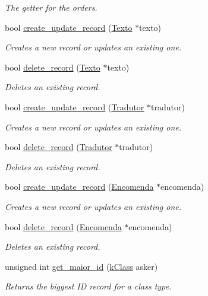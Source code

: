 \begin{DoxyCompactItemize}
\begin{DoxyCompactList}\small\item\em The getter for the orders. \end{DoxyCompactList}\item 
bool \hyperlink{class_database_manager_a10e0b6e056bcc0b669e272b839ae92fe}{create\-\_\-update\-\_\-record} (\hyperlink{class_texto}{Texto} $\ast$texto)
\begin{DoxyCompactList}\small\item\em Creates a new record or updates an existing one. \end{DoxyCompactList}\item 
bool \hyperlink{class_database_manager_aedc255310da21463f3297f3333898605}{delete\-\_\-record} (\hyperlink{class_texto}{Texto} $\ast$texto)
\begin{DoxyCompactList}\small\item\em Deletes an existing record. \end{DoxyCompactList}\item 
bool \hyperlink{class_database_manager_a587389f45912fee630df72658a4d09b0}{create\-\_\-update\-\_\-record} (\hyperlink{class_tradutor}{Tradutor} $\ast$tradutor)
\begin{DoxyCompactList}\small\item\em Creates a new record or updates an existing one. \end{DoxyCompactList}\item 
bool \hyperlink{class_database_manager_a861c8ab275b7d9e100ebb71889578c40}{delete\-\_\-record} (\hyperlink{class_tradutor}{Tradutor} $\ast$tradutor)
\begin{DoxyCompactList}\small\item\em Deletes an existing record. \end{DoxyCompactList}\item 
bool \hyperlink{class_database_manager_a10fd54af873e6902a3a6ee45f71eb42c}{create\-\_\-update\-\_\-record} (\hyperlink{class_encomenda}{Encomenda} $\ast$encomenda)
\begin{DoxyCompactList}\small\item\em Creates a new record or updates an existing one. \end{DoxyCompactList}\item 
bool \hyperlink{class_database_manager_aa78e5396d0be88098a97703f31fb72ec}{delete\-\_\-record} (\hyperlink{class_encomenda}{Encomenda} $\ast$encomenda)
\begin{DoxyCompactList}\small\item\em Deletes an existing record. \end{DoxyCompactList}\item 
unsigned int \hyperlink{class_database_manager_a5af3db3952fc2af64a43fd0403138c04}{get\-\_\-maior\-\_\-id} (\hyperlink{_database_manager_8h_ad36b2b2507c9846942e0b412d07e5438}{k\-Class} asker)
\begin{DoxyCompactList}\small\item\em Returns the biggest I\-D record for a class type. \end{DoxyCompactList}\end{DoxyCompactItemize}


